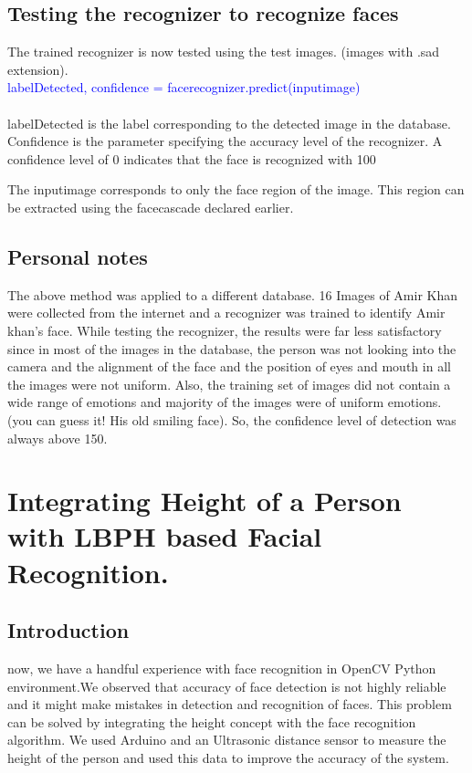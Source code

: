 \documentclass[a4paper,12pt]{article}
\begin{document}
\subsection{Testing the recognizer to recognize faces}
The trained recognizer is now tested using the test images. (images with .sad extension). 
\\
\newline \textcolor{blue}{labelDetected, confidence = face\textunderscore recognizer.predict(input\textunderscore image)}
\\
\\
labelDetected is the label corresponding to the detected image in the database. Confidence is the parameter specifying the 
accuracy level of the recognizer. A confidence level of 0 indicates that the face is recognized with 100%

The input\textunderscore image corresponds to only the face region of the image. This region can be extracted using the face\textunderscore cascade declared earlier. 

\subsection{Personal notes}
The above method was applied to a different database. 16 Images of Amir Khan were collected from the internet and a recognizer was 
trained to identify Amir khan's face. While testing the recognizer, the results were far less satisfactory since in most of the
images in the database, the person was not looking into the camera and the alignment of the face and the position of eyes and mouth 
in all the images were not uniform. Also, the training set of images did not contain a wide range of emotions and majority of the 
images were of uniform emotions. (you can guess it! His old smiling face). So, the confidence level of detection was always above 150. 

\newpage
\section{Integrating Height of a Person with LBPH based Facial Recognition.}

\subsection{Introduction}
now, we have  a handful experience with face recognition in OpenCV Python environment.We observed that accuracy of
face detection is not highly reliable and it might make mistakes in detection and recognition of  faces. This problem 
can be solved by integrating the height concept with the face recognition algorithm. We used Arduino and an Ultrasonic distance
sensor to measure the height of the person and used this data to improve the accuracy of the system.
\end{document}
